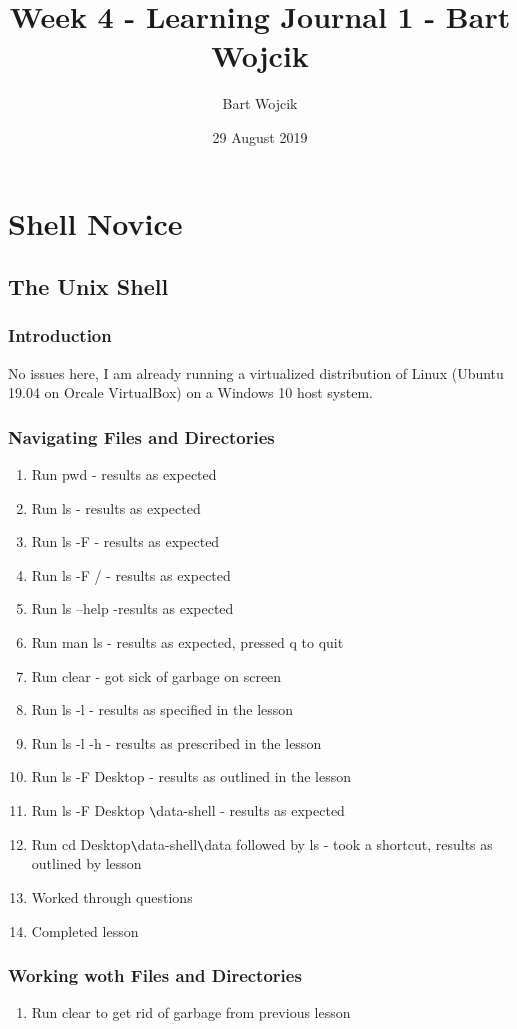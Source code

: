\documentclass{article}
\title{Week 4 - Learning Journal 1  - Bart Wojcik}
\author{Bart Wojcik}
\date{29 August 2019}
\begin{document}
\maketitle

\section{Shell Novice}
\subsection{The Unix Shell}
\subsubsection{Introduction}
No issues here, I am already running a virtualized distribution of Linux (Ubuntu 19.04 on Orcale VirtualBox) on a Windows 10 host system.
\subsubsection{Navigating Files and Directories}
\begin{enumerate}
    \item Run pwd - results as expected
    \item Run ls - results as expected
    \item Run ls -F - results as expected
    \item Run ls -F / - results as expected
    \item Run ls --help -results as expected
    \item Run man ls - results as expected, pressed q to quit
    \item Run clear - got sick of garbage on screen
    \item Run ls -l - results as specified in the lesson
    \item Run ls -l -h - results as prescribed in the lesson
    \item Run ls -F Desktop - results as outlined in the lesson
    \item Run ls -F Desktop \verb|\|data-shell - results as expected
    \item Run cd Desktop\verb|\|data-shell\verb|\|data followed by ls - took a shortcut, results as outlined by lesson
    \item Worked through questions
    \item Completed lesson
\end{enumerate}

\subsubsection{Working woth Files and Directories}
\begin{enumerate}
    \item Run clear to get rid of garbage from previous lesson
\end{enumerate}
\end{document}

